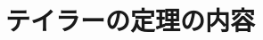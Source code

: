 \documentclass[../book_infinite_continuous_math]{subfiles}
\begin{document}
\section{テイラーの定理の内容}
\end{document}
